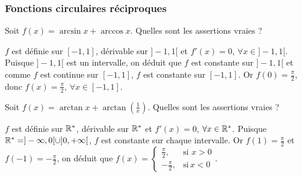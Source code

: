 \subsubsection{Fonctions circulaires réciproques}



\begin{question} 
Soit $f(x)=\arcsin x + \arccos x$.  Quelles sont les assertions vraies ?

\begin{answers}



\end{answers}
\begin{explanations}
$f$ est définie sur $[-1,1]$,  dérivable sur $]-1,1[$  et $f'(x)=0$, $\forall x \in ]-1,1[$. Puisque $]-1,1[$ est un intervalle, on déduit que $f$ est constante sur $]-1,1[$ et comme $f$ est continue sur $[-1,1]$, $f$ est constante sur $[-1,1]$. Or $f(0)=\frac{\pi}{2}$, donc $f(x)=\frac{\pi}{2}, \, \forall x \in [-1,1]$.
\end{explanations}


\end{question}


\begin{question} 
Soit   $f(x)= \arctan x + \arctan (\frac{1}{x})$.  Quelles sont les assertions vraies ?

\begin{answers}
    



    
\end{answers}
\begin{explanations}
$f$ est définie sur $\mathbb{R}^*$,  dérivable sur  $\mathbb{R}^*$ et $f'(x)=0$, $\forall x \in \mathbb{R}^*$. Puisque $\mathbb{R}^* =]-\infty,0[\cup ]0,+\infty[$, $f$ est constante sur chaque intervalle. Or $f(1)=\frac{\pi}{2}$ et $f(-1)=-\frac{\pi}{2}$, on déduit que $f(x)=\left\{\begin{array}{cc}\frac{\pi}{2},& \mbox{si} \, \, x >0 \\ -\frac{\pi}{2},& \mbox{si} \,  x <0  \end{array}\right.$.
\end{explanations}

\end{question}

